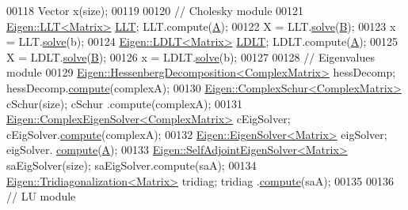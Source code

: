 \begin{DoxyCode}
00118   Vector x(size);
00119 
00120   \textcolor{comment}{// Cholesky module}
00121   \hyperlink{group___cholesky___module_class_eigen_1_1_l_l_t}{Eigen::LLT<Matrix>}  \hyperlink{group___cholesky___module_class_eigen_1_1_l_l_t}{LLT};  LLT.compute(\hyperlink{group___core___module_class_eigen_1_1_matrix}{A});
00122   X = LLT.\hyperlink{group___cholesky___module_a3738bb3ce6f9b837a2beb432b937499f}{solve}(\hyperlink{group___core___module_class_eigen_1_1_matrix}{B});
00123   x = LLT.\hyperlink{group___cholesky___module_a3738bb3ce6f9b837a2beb432b937499f}{solve}(b);
00124   \hyperlink{group___cholesky___module_class_eigen_1_1_l_d_l_t}{Eigen::LDLT<Matrix>} \hyperlink{group___cholesky___module_class_eigen_1_1_l_d_l_t}{LDLT}; LDLT.compute(\hyperlink{group___core___module_class_eigen_1_1_matrix}{A});
00125   X = LDLT.\hyperlink{group___cholesky___module_aa257dd7a8acf8b347d5a22a13d6ca3e1}{solve}(\hyperlink{group___core___module_class_eigen_1_1_matrix}{B});
00126   x = LDLT.\hyperlink{group___cholesky___module_aa257dd7a8acf8b347d5a22a13d6ca3e1}{solve}(b);
00127 
00128   \textcolor{comment}{// Eigenvalues module}
00129   \hyperlink{group___eigenvalues___module_class_eigen_1_1_hessenberg_decomposition}{Eigen::HessenbergDecomposition<ComplexMatrix>} hessDecomp;   
           hessDecomp.\hyperlink{group___eigenvalues___module_a239a6fd42c57aab3c0b048c47fde3004}{compute}(complexA);
00130   \hyperlink{group___eigenvalues___module_class_eigen_1_1_complex_schur}{Eigen::ComplexSchur<ComplexMatrix>}            cSchur(size);      cSchur
      .compute(complexA);
00131   \hyperlink{group___eigenvalues___module_class_eigen_1_1_complex_eigen_solver}{Eigen::ComplexEigenSolver<ComplexMatrix>}      cEigSolver;        
      cEigSolver.\hyperlink{group___eigenvalues___module_aeb7e38c6db5369f5c974f3786e94c1f0}{compute}(complexA);
00132   \hyperlink{group___eigenvalues___module_class_eigen_1_1_eigen_solver}{Eigen::EigenSolver<Matrix>}                    eigSolver;         eigSolver.
      \hyperlink{group___eigenvalues___module_a38d032b75b3e75640e3db42e7ab20c24}{compute}(\hyperlink{group___core___module_class_eigen_1_1_matrix}{A});
00133   \hyperlink{group___eigenvalues___module_class_eigen_1_1_self_adjoint_eigen_solver}{Eigen::SelfAdjointEigenSolver<Matrix>}         saEigSolver(size); 
      saEigSolver.compute(saA);
00134   \hyperlink{group___eigenvalues___module_class_eigen_1_1_tridiagonalization}{Eigen::Tridiagonalization<Matrix>}             tridiag;           tridiag
      .\hyperlink{group___eigenvalues___module_acd288abb081d3b40b87e4b98cd8f6ee9}{compute}(saA);
00135 
00136   \textcolor{comment}{// LU module}

\end{DoxyCode}
